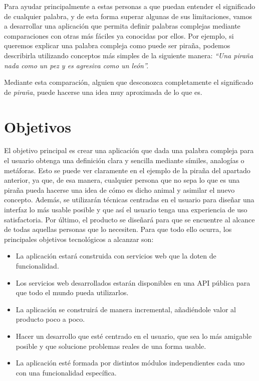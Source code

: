 Para ayudar principalmente a estas personas a que puedan entender el significado de cualquier palabra, y de esta forma superar algunas de sus limitaciones, vamos a desarrollar una aplicación que permita definir palabras complejas mediante comparaciones con otras más fáciles ya conocidas por ellos. Por ejemplo, si queremos explicar una palabra compleja como puede ser piraña, podemos describirla utilizando conceptos más simples de la siguiente manera:\textit{ ``Una piraña nada como un pez y es agresiva como un león''.}

Mediante esta comparación, alguien que desconozca completamente el significado de \textit{piraña}, puede hacerse una idea muy aproximada de lo que es.


\section{Objetivos}
\label{cap:sec:objetivos}

El objetivo principal es crear una aplicación que dada una palabra compleja para el usuario obtenga una definición clara y sencilla mediante símiles, analogías o metáforas. 
Esto se puede ver claramente en el ejemplo de la piraña del apartado anterior, ya que, de esa manera, cualquier persona que no sepa lo que es una piraña pueda hacerse una idea de cómo es dicho animal y asimilar el nuevo concepto. Además, se utilizarán técnicas centradas en el usuario para diseñar una interfaz lo más usable posible y que así el usuario tenga una experiencia de uso satisfactoria. Por último, el producto se diseñará para que se encuentre al alcance de todas aquellas personas que lo necesiten.
 Para que todo ello ocurra, los principales objetivos tecnológicos a alcanzar son:
\begin{itemize}
	\item La aplicación estará construida con servicios web que la doten de funcionalidad. 
	\item Los servicios web desarrollados estarán disponibles en una API pública para que todo el mundo pueda utilizarlos.	
	\item La aplicación se construirá de manera incremental, añadiéndole valor al producto poco a poco.	
	\item Hacer un desarrollo que esté centrado en el usuario, que sea lo más amigable posible y que solucione problemas reales de una forma usable.
	\item La aplicación esté formada por distintos módulos independientes cada uno con una funcionalidad específica. 
\end{itemize}

